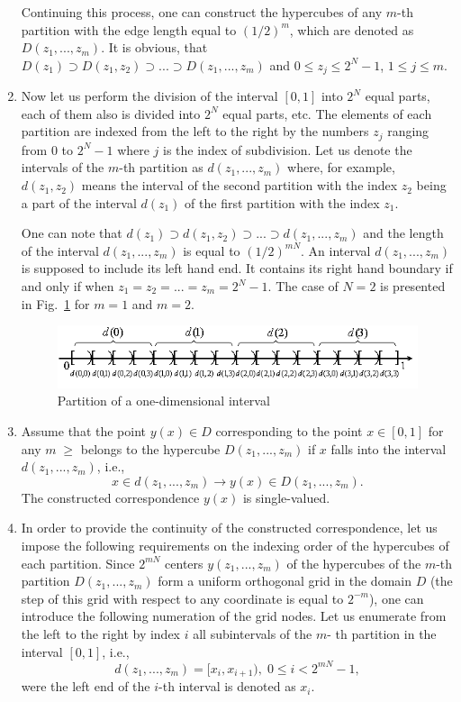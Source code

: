 \begin{enumerate}
Continuing this process, one can construct the hypercubes of any $m$-th partition with the edge length equal to $(1/2)^m$, which are denoted as $D(z_1,...,z_m)$. It is obvious, that $D(z_1) \supset D(z_1,z_2) \supset ... \supset D(z_1,...,z_m)$ and $0 \leq z_j \leq 2^N-1$, \mbox{$1 \leq j \leq m$}.

\item
Now let us perform the division of the interval $[0,1]$ into $2^N$ equal parts, each of them also is divided into $2^N$ equal parts, etc. The elements of each partition are indexed from the left to the right by the numbers $z_j$ ranging from $0$ to \mbox{$2^N-1$} where $j$ is the index of subdivision. Let us denote the intervals of the $m$-th partition as $d(z_1,...,z_m)$ where, for example, $d(z_1,z_2)$ means the interval of the second partition with the index $z_2$ being a part of the interval $d(z_1)$ of the first partition with the index $z_1$.

One can note that  $d(z_1) \supset d(z_1,z_2) \supset ... \supset d(z_1,...,z_m)$ and the length of the interval $d(z_1,...,z_m)$ is equal to  $(1/2)^{mN}$. An interval $d(z_1,...,z_m)$ is supposed to include its left hand end. It contains its right hand boundary if and only if when $z_1=z_2=...=z_m=2^N-1$. The case of $N=2$ is presented in Fig.~\ref{6_fig_3} for $m=1$ and $m=2$.

\begin{figure}[t]
\includegraphics[width=0.9\linewidth]{figures/6_3.png}
\caption{Partition of a one-dimensional interval}
\label{6_fig_3}     
\end{figure}

\item
Assume that the point $y(x) \in D$ corresponding to the point $x \in [0,1]$ for any $m \geq $ belongs to the hypercube $D(z_1,...,z_m)$ if $x$ falls into the interval $d(z_1,...,z_m)$, i.e.,
\[
x \in d(z_1,...,z_m) \rightarrow y(x) \in D(z_1,...,z_m).
\]
The constructed correspondence  $y(x)$ is single-valued.
\item
In order to provide the continuity of the constructed correspondence, let us impose the following requirements on the indexing order of the hypercubes of each partition. Since $2^{mN}$ centers $y(z_1,...,z_m)$ of the hypercubes of the $m$-th partition $D(z_1,...,z_m)$ form a uniform orthogonal grid in the domain $D$ (the step of this grid with respect to any coordinate is equal to $2^{-m}$), one can introduce the following numeration of the grid nodes. Let us enumerate from the left to the right by index $i$ all subintervals of the $m$- 	th partition in the interval $[0,1]$, i.e.,
\[
d(z_1,...,z_m)=[x_i, x_{i+1}), \; 0 \leq i < 2^{mN}-1,
\]
were the left end of the $i$-th interval is denoted as $x_i$.


\end{enumerate}
